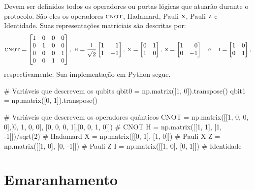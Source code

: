 Devem ser definidos todos os operadores ou portas lógicas que atuarão durante o protocolo. São eles os operadores \(\operatorname{\textsc{cnot}}\), Hadamard, Pauli \(\operatorname{\textsc{x}}\), Pauli \(\operatorname{\textsc{z}}\) e Identidade. Suas representações matriciais são descritas por:
\[ \CNOT =
  \begin{bmatrix}
    1 & 0 & 0 & 0 \\
    0 & 1 & 0 & 0 \\
    0 & 0 & 0 & 1 \\
    0 & 0 & 1 & 0
  \end{bmatrix},\;
  \HAD = \frac{1}{\sqrt{2}} \begin{bmatrix*}[r] 1 & 1 \\ 1 & -1 \end{bmatrix*},\;
  \XXX = \begin{bmatrix} 0 & 1 \\ 1 & 0 \end{bmatrix},\;
  \ZZZ = \begin{bmatrix*}[r] 1 & 0 \\ 0 & -1 \end{bmatrix*} \quad \text{e} \quad
  \III = \begin{bmatrix} 1 & 0 \\ 0 & 1 \end{bmatrix},
\]
respectivamente. Sua implementação em Python segue.
\begin{pycode}
    # Variáveis que descrevem os qubits
    qbit0 = np.matrix([1, 0]).transpose()
    qbit1 = np.matrix([0, 1]).transpose()

    # Variáveis que descrevem os operadores quânticos
    CNOT = np.matrix([[1, 0, 0, 0],[0, 1, 0, 0],
                      [0, 0, 0, 1],[0, 0, 1, 0]])  # CNOT
    H = np.matrix([[1, 1], [1, -1]])/sqrt(2)  # Hadamard
    X = np.matrix([[0, 1], [1, 0]])           # Pauli X
    Z = np.matrix([[1, 0], [0, -1]])          # Pauli Z
    I = np.matrix([[1, 0], [0, 1]])           # Identidade
\end{pycode}

\section{Emaranhamento}\label{emaranhamento}

